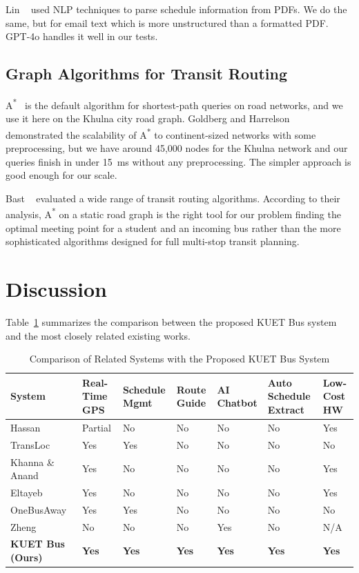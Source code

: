 \documentclass[12pt,a4paper]{report}
\begin{document}
Lin ~\cite{lin2023ai} used NLP techniques to parse schedule information from PDFs. We do the same, but for email text which is more unstructured than a formatted PDF. GPT-4o handles it well in our tests.

\subsection{Graph Algorithms for Transit Routing}

A\textsuperscript{*}~\cite{hart1968formal} is the default algorithm for shortest-path queries on road networks, and we use it here on the Khulna city road graph. Goldberg and Harrelson~\cite{goldberg2005astar} demonstrated the scalability of A\textsuperscript{*} to continent-sized networks with some preprocessing, but we have around 45,000 nodes for the Khulna network and our queries finish in under 15~ms without any preprocessing. The simpler approach is good enough for our scale.

Bast ~\cite{bast2016route} evaluated a wide range of transit routing algorithms. According to their analysis, A\textsuperscript{*} on a static road graph is the right tool for our problem finding the optimal meeting point for a student and an incoming bus rather than the more sophisticated algorithms designed for full multi-stop transit planning.

\section{Discussion}

Table~\ref{tab:relatedcomp} summarizes the comparison between the proposed KUET Bus system and the most closely related existing works.

\begin{table}[t]
\caption{Comparison of Related Systems with the Proposed KUET Bus System}
\label{tab:relatedcomp}
\centering
\begin{tabularx}{\linewidth}{lXXXXXX}
\toprule
\textbf{System} & \textbf{Real-Time GPS} & \textbf{Schedule Mgmt} & \textbf{Route Guide} & \textbf{AI Chatbot} & \textbf{Auto Schedule Extract} & \textbf{Low-Cost HW}\\
\midrule
Hassan ~\cite{hassan2014gps}        & Partial & No  & No  & No  & No  & Yes \\
TransLoc~\cite{transloc2024}             & Yes     & Yes & No  & No  & No  & No  \\
Khanna \& Anand~\cite{khanna2016iot}     & Yes     & No  & No  & No  & No  & Yes \\
Eltayeb ~\cite{eltayeb2021}        & Yes     & No  & No  & No  & No  & Yes \\
OneBusAway~\cite{ferris2010onebusaway}   & Yes     & Yes & No  & No  & No  & No  \\
Zheng ~\cite{zheng2024llm}         & No      & No  & No  & Yes & No  & N/A \\
\textbf{KUET Bus (Ours)} & \textbf{Yes} & \textbf{Yes} & \textbf{Yes} & \textbf{Yes} & \textbf{Yes} & \textbf{Yes}\\
\bottomrule
\end{tabularx}
\end{table}
\end{document}
